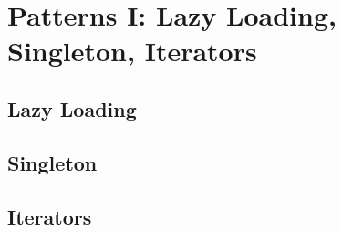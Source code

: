 \chapter{Patterns I: Lazy Loading, Singleton, Iterators}

\section{Lazy Loading}

\section{Singleton}

\section{Iterators}

